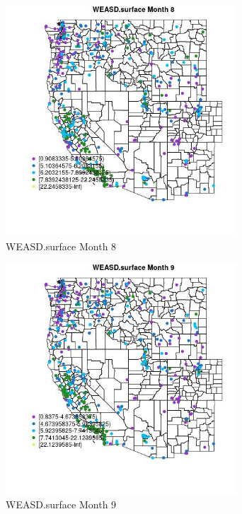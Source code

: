 \begin{figure} 
\centering  
\includegraphics[width=0.77\textwidth]{Code_Outputs/ML_input_report_ML_input_PM25_Step5_part_d_de_duplicated_aves_ML_input_MapObsMo8WEASDsurface.jpg} 
\caption{\label{fig:ML_input_report_ML_input_PM25_Step5_part_d_de_duplicated_aves_ML_inputMapObsMo8WEASDsurface}WEASD.surface Month 8} 
\end{figure} 
 

\begin{figure} 
\centering  
\includegraphics[width=0.77\textwidth]{Code_Outputs/ML_input_report_ML_input_PM25_Step5_part_d_de_duplicated_aves_ML_input_MapObsMo9WEASDsurface.jpg} 
\caption{\label{fig:ML_input_report_ML_input_PM25_Step5_part_d_de_duplicated_aves_ML_inputMapObsMo9WEASDsurface}WEASD.surface Month 9} 
\end{figure} 
 

